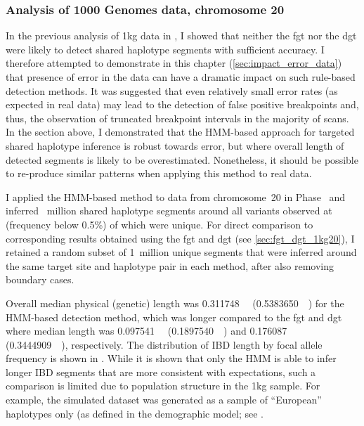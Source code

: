 %

%



%
\subsubsection{Analysis of 1000 Genomes data, chromosome 20}
%


In the previous analysis of \gls{1kg} data in , I showed that neither the \gls{fgt} nor the \gls{dgt} were likely to detect shared haplotype segments with sufficient accuracy.
I therefore attempted to demonstrate in this chapter (\cref{sec:impact_error_data}) that presence of error in the data can have a dramatic impact on such rule-based detection methods.
It was suggested that even relatively small error rates (as expected in real data) may lead to the detection of false positive breakpoints and, thus, the observation of truncated breakpoint intervals in the majority of scans.
In the section above, I demonstrated that the HMM-based approach for targeted shared haplotype inference is robust towards error, but where overall length of detected segments is likely to be overestimated.
Nonetheless, it should be possible to re-produce similar patterns when applying this method to real data.

%

%

I applied the HMM-based method to data from chromosome~20 in  Phase~ and inferred {}~million shared haplotype segments around all variants observed at \fk{[2,25]} (\ie frequency below 0.5\%) of which {} were unique.
For direct comparison to corresponding results obtained using the \gls{fgt} and \gls{dgt} (see \cref{sec:fgt_dgt_1kg20}), I retained a random subset of 1~million unique segments that were inferred around the same target site and haplotype pair in each method, after also removing boundary cases.

Overall median physical (genetic) length was
\SI{0.311748}{\mega\basepair} (\SI{0.5383650}{\centi\morgan}) for the HMM-based detection method, which was longer compared to the \gls{fgt} and \gls{dgt} where median length was
\SI{0.097541}{\mega\basepair} (\SI{0.1897540}{\centi\morgan}) and
\SI{0.176087}{\mega\basepair} (\SI{0.3444909}{\centi\morgan}), respectively.
The distribution of IBD length by focal allele frequency is shown in .
While it is shown that only the HMM is able to infer longer IBD segments that are more consistent with expectations, such a comparison is limited due to population structure in the \gls{1kg} sample.
For example, the simulated dataset was generated as a sample of ``European'' haplotypes only (as defined in the demographic model; see .

